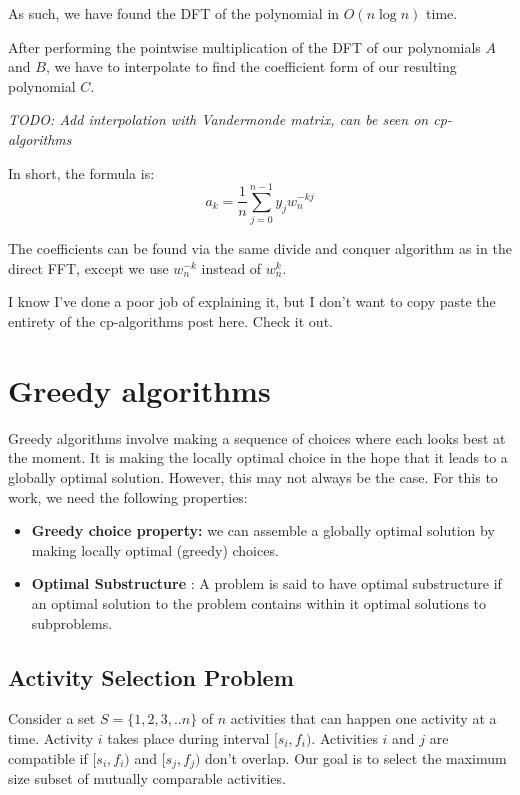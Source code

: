 \documentclass[12pt,letterpaper]{article}
\theoremstyle{definition}
\begin{document}
As such, we have found the DFT of the polynomial in $O(n \log n)$ time.

After performing the pointwise multiplication of the DFT of our polynomials $A$ and $B$, we have to interpolate to find the coefficient form of our resulting polynomial $C$.

\textit{TODO: Add interpolation with Vandermonde matrix, can be seen on cp-algorithms} 

In short, the formula is:
\[a_k = \frac{1}{n} \sum_{j=0}^{n-1} y_j w_n^{-kj}\]

The coefficients can be found via the same divide and conquer algorithm as in the direct FFT, except we use $w_n^{-k}$ instead of $w_n^k$.

I know I've done a poor job of explaining it, but I don't want to copy paste the entirety of the cp-algorithms post here. Check it out.

\section{Greedy algorithms}

Greedy algorithms involve making a sequence of choices where each looks best at the moment. It is making the locally optimal choice in the hope that it leads to a globally optimal solution. However, this may not always be the case. For this to work, we need the following properties:

\begin{itemize}
  \item \textbf{Greedy choice property:} we can assemble a globally optimal solution by making locally optimal (greedy) choices.
  \item \textbf{Optimal Substructure} : A problem is said to have optimal substructure if an optimal solution to the problem contains within it optimal solutions to subproblems. 
\end{itemize}

\subsection{Activity Selection Problem}

Consider a set $S = \{1,2,3,..n\}$ of $n$ activities that can happen one activity at a time. Activity $i$ takes place during interval $[s_i,f_i)$. Activities $i$ and $j$ are compatible if $[s_i,f_i)$ and $[s_j,f_j)$ don't overlap. Our goal is to select the maximum size subset of mutually comparable activities. 
\end{document}
